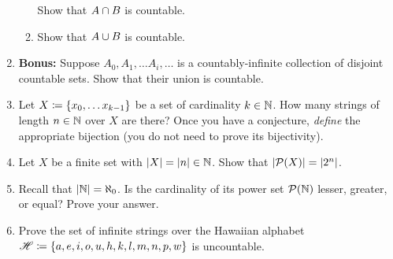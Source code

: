 \begin{enumerate}
\begin{enumerate}
                Show that $A \cap B$ is countable.
            \item
                Show that $A \cup B$ is countable.
        \end{enumerate}
    \item
        \textbf{Bonus:}
        Suppose $A_0, A_1, \dots A_i, \dots$ is a countably-infinite collection of
        disjoint countable sets. %
        Show that their union is countable.
    \item
        Let $X \defn \set*{x_0, \dots x_{k - 1}}$ be a set of cardinality $k \in \mathbb{N}$.
        How many strings of length $n \in \mathbb{N}$ over $X$ are there?
        Once you have a conjecture, \emph{define} the appropriate bijection
        (you do not need to prove its bijectivity).
    \item
        Let $X$ be a finite set with $\lvert X\rvert = \lvert n\rvert \in \mathbb{N}$.
        Show that $\cardinality{\power{X}} = \cardinality{2^n}$.
    \item
        Recall that $\lvert\mathbb{N}\rvert = \aleph_0$.
        Is the cardinality of its power set $\power{\N}$ lesser, greater, or equal?
        Prove your answer.
    \item
        Prove the set of infinite strings over the Hawaiian alphabet
        $\mathscr{H} \defn \set*{a, e, i, o, u, h, k, l, m, n, p, w}$ is uncountable.
\end{enumerate}

